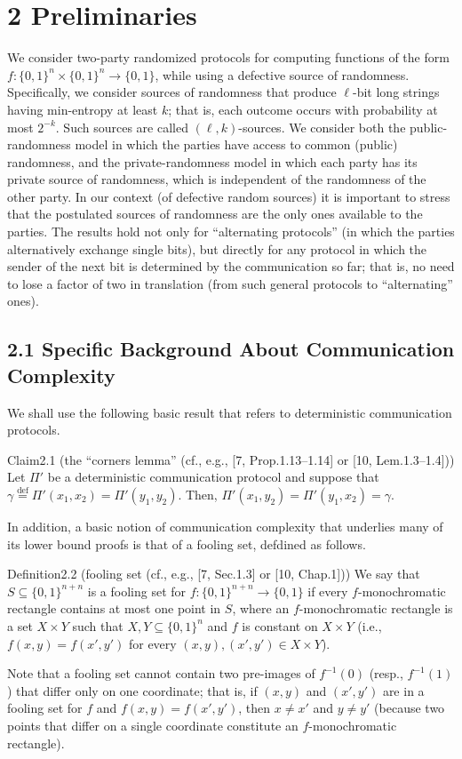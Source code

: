 \section*{2 Preliminaries}
We consider two-party randomized protocols for computing functions of the form $f:\{0,1\}^n\times\{0,1\}^n\to\{0,1\}$, while using a defective source of randomness. Specifically, we consider sources of randomness that produce $\ell$-bit long strings having min-entropy at least $k$; that is, each outcome occurs with probability at most $2^{-k}$. Such sources are called $(\ell,k)$-sources.
We consider both the public-randomness model in which the parties have access to common (public) randomness, and the private-randomness model in which each party has its private source of randomness, which is independent of the randomness of the other party. In our context (of defective random sources) it is important to stress that the postulated sources of randomness are the only ones available to the parties.
The results hold not only for ``alternating protocols'' (in which the parties alternatively exchange single bits), but directly for any protocol in which the sender of the next bit is determined by the communication so far; that is, no need to lose a factor of two in translation (from such general protocols to ``alternating'' ones).
\subsection*{2.1 Specific Background About Communication Complexity}
We shall use the following basic result that refers to deterministic communication protocols.
\begin{authorclaim}{Claim2.1 (the ``corners lemma'' (cf., e.g., [7, Prop.1.13--1.14] or [10, Lem.1.3--1.4]))}
Let $\Pi'$ be a deterministic communication protocol and suppose that $\gamma\stackrel{\mathrm{def}}=\Pi'(x_1,x_2)=\Pi'(y_1,y_2)$. Then, $\Pi'(x_1,y_2)=\Pi'(y_1,x_2)=\gamma$.
\end{authorclaim}
In addition, a basic notion of communication complexity that underlies many of its lower bound proofs is that of a fooling set, defdined as follows.
\begin{authorclaim}{Definition2.2 (fooling set (cf., e.g., [7, Sec.1.3] or [10, Chap.1]))}
We say that $S\subseteq\{0,1\}^{n+n}$ is a fooling set for $f:\{0,1\}^{n+n}\to\{0,1\}$ if every $f$-monochromatic rectangle contains at most one point in $S$, where an $f$-monochromatic rectangle is a set $X\times Y$ such that $X,Y\subseteq\{0,1\}^n$ and $f$ is constant on $X\times Y$ (i.e., $f(x,y)=f(x',y')$ for every $(x,y),(x',y')\in X\times Y$).
\end{authorclaim}
Note that a fooling set cannot contain two pre-images of $f^{-1}(0)$ (resp., $f^{-1}(1)$) that differ only on one coordinate; that is, if $(x,y)$ and $(x',y')$ are in a fooling set for $f$ and $f(x,y)=f(x',y')$, then $x\ne x'$ and $y\ne y'$ (because two points that differ on a single coordinate constitute an $f$-monochromatic rectangle).
